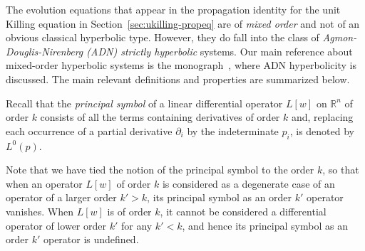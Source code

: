 \documentclass[a4paper]{article}
\theoremstyle{remark}
\newcommand{\del}{\partial}
\begin{document}
The evolution equations that appear in the propagation identity for the unit
Killing equation in Section~\ref{sec:ukilling-propeq} are of \emph{mixed order}
and not of an obvious classical hyperbolic type. However, they do fall into the
class of \emph{Agmon-Douglis-Nirenberg (ADN) strictly hyperbolic} systems. Our
main reference about mixed-order hyperbolic systems is the
monograph~\cite{gv-mixed}, where ADN hyperbolicity is discussed. The main
relevant definitions and properties are summarized below.

Recall that the \emph{principal symbol} of a linear differential
operator $L[w]$ on $\mathbb{R}^n$ of order $k$ consists of all the terms
containing derivatives of order $k$ and, replacing each occurrence of a
partial derivative $\del_i$ by the indeterminate $p_i$, is denoted by
$L^0(p)$.

Note that we have tied the notion of the principal symbol to
the order $k$, so that when an operator $L[w]$ of order $k$ is
considered as a degenerate case of an operator of a larger order $k'>k$, its
principal symbol as an order $k'$ operator vanishes. When $L[w]$ is of
order $k$, it cannot be considered a differential operator of lower order $k'$
for any $k'<k$, and hence its principal symbol as an order $k'$ operator
is undefined.
\end{document}
